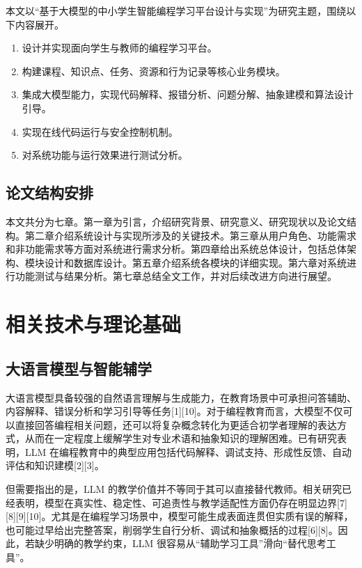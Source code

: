 本文以``基于大模型的中小学生智能编程学习平台设计与实现''为研究主题，围绕以下内容展开。

\begin{enumerate}
\def\labelenumi{(\arabic{enumii})}
\tightlist
\item
  设计并实现面向学生与教师的编程学习平台。
\item
  构建课程、知识点、任务、资源和行为记录等核心业务模块。
\item
  集成大模型能力，实现代码解释、报错分析、问题分解、抽象建模和算法设计引导。
\item
  实现在线代码运行与安全控制机制。
\item
  对系统功能与运行效果进行测试分析。
\end{enumerate}

\section{论文结构安排}\label{ux8bbaux6587ux7ed3ux6784ux5b89ux6392}

本文共分为七章。第一章为引言，介绍研究背景、研究意义、研究现状以及论文结构。第二章介绍系统设计与实现所涉及的关键技术。第三章从用户角色、功能需求和非功能需求等方面对系统进行需求分析。第四章给出系统总体设计，包括总体架构、模块设计和数据库设计。第五章介绍系统各模块的详细实现。第六章对系统进行功能测试与结果分析。第七章总结全文工作，并对后续改进方向进行展望。

\chapter{相关技术与理论基础}\label{ux76f8ux5173ux6280ux672fux4e0eux7406ux8bbaux57faux7840}

\section{大语言模型与智能辅学}\label{ux5927ux8bedux8a00ux6a21ux578bux4e0eux667aux80fdux8f85ux5b66}

大语言模型具备较强的自然语言理解与生成能力，在教育场景中可承担问答辅助、内容解释、错误分析和学习引导等任务{[}1{]}{[}10{]}。对于编程教育而言，大模型不仅可以直接回答编程相关问题，还可以将复杂概念转化为更适合初学者理解的表达方式，从而在一定程度上缓解学生对专业术语和抽象知识的理解困难。已有研究表明，LLM 在编程教育中的典型应用包括代码解释、调试支持、形成性反馈、自动评估和知识建模{[}2{]}{[}3{]}。

但需要指出的是，LLM 的教学价值并不等同于其可以直接替代教师。相关研究已经表明，模型在真实性、稳定性、可追责性与教学适配性方面仍存在明显边界{[}7{]}{[}8{]}{[}9{]}{[}10{]}。尤其是在编程学习场景中，模型可能生成表面连贯但实质有误的解释，也可能过早给出完整答案，削弱学生自行分析、调试和抽象概括的过程{[}6{]}{[}8{]}。因此，若缺少明确的教学约束，LLM 很容易从``辅助学习工具''滑向``替代思考工具''。

